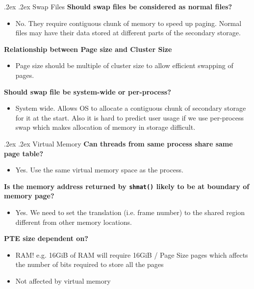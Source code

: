 \documentclass[13pt,landscape,a4paper]{article}
\makeatletter
\renewcommand{\subsection}{\@startsection{subsection}{1}{0mm}%
    {.2ex}%
    {.2ex}%
    {\sffamily\bfseries}}
\makeatother
\begin{document}
\begin{multicols*}{3}
        \subsection{Swap Files}
        \textbf{Should swap files be considered as normal files?}
        \begin{itemize}
            \item No. They require contiguous chunk of memory to speed up paging. Normal files may have their data stored at different parts of the secondary storage.
        \end{itemize}
        \textbf{Relationship between Page size and Cluster Size}
        \begin{itemize}
            \item Page size should be multiple of cluster size to allow efficient swapping of pages.
        \end{itemize}
        \textbf{Should swap file be system-wide or per-process?}
        \begin{itemize}
            \item System wide. Allows OS to allocate a contiguous chunk of secondary storage for it at the start. Also it is hard to predict user usage if we use per-process swap which makes allocation of memory in storage difficult.
        \end{itemize}
        \subsection{Virtual Memory}
        \textbf{Can threads from same process share same page table?}
        \begin{itemize}
            \item Yes. Use the same virtual memory space as the process.
        \end{itemize}
        \textbf{Is the memory address returned by \texttt{shmat()} likely to be at boundary of memory page?}
        \begin{itemize}
            \item Yes. We need to set the translation (i.e. frame number) to the shared region different from other memory locations.
        \end{itemize}
        \textbf{PTE size dependent on?}
        \begin{itemize}
            \item RAM! e.g. 16GiB of RAM will require 16GiB / Page Size pages which affects the number of bits required to store all the pages
            \item Not affected by virtual memory
        \end{itemize}

\end{multicols*}
\end{document}
